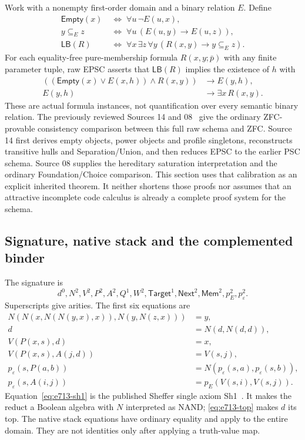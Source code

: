 Work with a nonempty first-order domain and a binary relation $E$. Define
\begin{align*}
 \mathsf{Empty}(x)&\;\Longleftrightarrow\;\forall u\,\neg E(u,x),\\
 y\subseteq_E z&\;\Longleftrightarrow\;\forall u\,(E(u,y)\to E(u,z)),\\
 \mathsf{LB}(R)&\;\Longleftrightarrow\;
       \forall x\,\exists z\,\forall y\,(R(x,y)\to y\subseteq_E z).
\end{align*}
For each equality-free pure-membership formula $R(x,y;\bar p)$ with any
finite parameter tuple, raw EPSC asserts that $\mathsf{LB}(R)$ implies
the existence of $h$ with
\begin{align}
 ((\mathsf{Empty}(x)\lor E(x,h))\land R(x,y))&\longrightarrow E(y,h),
 \label{eq:e713-close}\\
 E(y,h)&\longrightarrow\exists x\,R(x,y).
 \label{eq:e713-support}
\end{align}
These are actual formula instances, not quantification over every semantic
binary relation. The previously reviewed Sources 14 and 08~\cite{epsc14} give the
ordinary ZFC-provable consistency comparison between this full raw schema
and ZFC. Source 14 first derives empty objects, power objects and profile
singletons, reconstructs transitive hulls and Separation/Union, and then
reduces EPSC to the earlier PSC schema. Source 08 supplies the hereditary
saturation interpretation and the ordinary Foundation/Choice comparison.
This section uses that calibration as an explicit inherited theorem.
It neither shortens those proofs nor assumes that an attractive incomplete
code calculus is already a complete proof system for the schema.

\subsection{Signature, native stack and the complemented binder}

The signature is
\[
 d^0,N^2,V^2,P^2,A^2,Q^1,W^2,
 \mathsf{Target}^1,\mathsf{Next}^2,\mathsf{Mem}^2,
 p_E^2,p_\varepsilon^2.
\]
Superscripts give arities. The first six equations are
\begin{align}
 N(N(x,N(N(y,x),x)),N(y,N(z,x)))&=y,\label{eq:e713-sh1}\\
 d&=N(d,N(d,d)),\label{eq:e713-top}\\
 V(P(x,s),d)&=x,\label{eq:e713-head}\\
 V(P(x,s),A(j,d))&=V(s,j),\label{eq:e713-tail}\\
 p_\varepsilon(s,P(a,b))&=N(p_\varepsilon(s,a),p_\varepsilon(s,b)),
 \label{eq:e713-nand}\\
 p_\varepsilon(s,A(i,j))&=p_E(V(s,i),V(s,j)).\label{eq:e713-atom}
\end{align}
Equation~\eqref{eq:e713-sh1} is the published Sheffer single axiom Sh1~\cite{sh1}.
It makes the reduct a Boolean algebra with $N$ interpreted as NAND;
\eqref{eq:e713-top} makes $d$ its top. The native stack equations have
ordinary equality and apply to the entire domain. They are not identities
only after applying a truth-value map.

